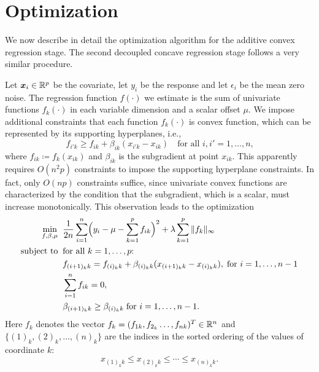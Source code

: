 \def\uds#1{#1}

\section{Optimization}
\label{sec:optimization}

We now describe in detail the optimization algorithm for the additive
convex regression stage.  The second decoupled concave regression stage
follows a very similar procedure.

Let $\boldsymbol{x}_{i}\in\mathbb{R}^{p}$ be the covariate, let $y_{i}$ be
the response and let $\epsilon_{i}$ be the mean zero noise. The
regression function $f(\cdot)$ we estimate is the sum of
univariate functions $f_{k}(\cdot)$ in each variable dimension and a scalar
offset $\mu$.  We impose additional constraints that each
function $f_{k}(\cdot)$ is convex function, which can be
represented by its supporting hyperplanes, i.e.,
\begin{equation}\label{hyper}
      f_{i'k} \geq f_{ik} + \beta_{ik}(x_{i'k}-x_{ik}) \quad
      \textrm{for all $i,i' = 1,\ldots, n$,}
\end{equation}
where $f_{ik}\coloneqq f_{k}(x_{ik})$ and $\beta_{ik}$ is the
subgradient at point $x_{ik}$. This apparently requires $O(n^2 p)$ constraints to
impose the supporting hyperplane constraints.
In fact, only $O(np)$
constraints suffice, since univariate convex functions are
characterized by the condition that the subgradient, which is a scalar, must
increase monotonically. This observation leads to the  optimization
\begin{equation}
\begin{split}
       \min_{f,\beta,\mu} & \;\; \frac{1}{2n}\sum_{i=1}^{n}
                     \Bigl( y_{i}-\mu - \sum_{k=1}^{p}f_{ik}\Bigr)^{2} 
                         + \lambda\sum_{k=1}^{p}\|f_k\|_{\infty} \\
       \textrm{subject to} &\;\; \textrm{for all $k=1,\ldots, p$:}\\
       & \;\; f_{(i+1)_k k} = f_{(i)_k k} +
       \beta_{(i)_k k}(x_{(i+1)_k k}-x_{(i)_k k}),\;\textrm{for $i=1,\ldots, n-1$}\\
       & \;\; \sum_{i=1}^{n}f_{ik}=0,\\
       & \;\; \beta_{(i+1)_k k} \geq \beta_{(i)_k k}\;\textrm{for $i=1,\ldots, n-1$}.
\end{split}
\label{np}
\end{equation}
Here $f_k$ denotes the vector $f_k = (f_{1k}, f_{2_k}\ldots, f_{nk})^T\in{\mathbb R}^n$
and $\{(1)_k,(2)_k,\ldots,(n)_k\}$ are the indices in the sorted ordering
of the values of coordinate $k$:
\begin{equation}
x_{(1)_k k} \leq{} x_{(2)_k k} \leq \cdots \leq{} x_{(n)_k k}.
\end{equation}


